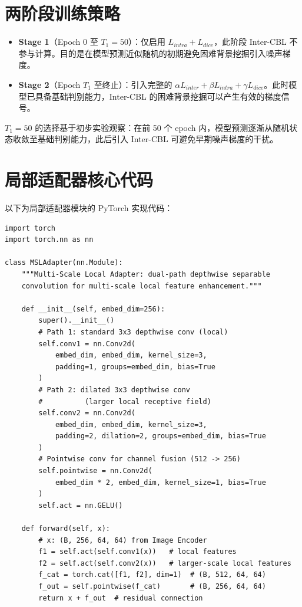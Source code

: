 \section{两阶段训练策略}

\begin{itemize}
  \item \textbf{Stage 1}（Epoch 0 至 $T_1=50$）：仅启用 $L_{intra} + L_{dice}$，此阶段 Inter-CBL 不参与计算。目的是在模型预测近似随机的初期避免困难背景挖掘引入噪声梯度。
  \item \textbf{Stage 2}（Epoch $T_1$ 至终止）：引入完整的 $\alpha L_{inter} + \beta L_{intra} + \gamma L_{dice}$。此时模型已具备基础判别能力，Inter-CBL 的困难背景挖掘可以产生有效的梯度信号。
\end{itemize}

$T_1=50$ 的选择基于初步实验观察：在前 50 个 epoch 内，模型预测逐渐从随机状态收敛至基础判别能力，此后引入 Inter-CBL 可避免早期噪声梯度的干扰。

\section{局部适配器核心代码}

以下为局部适配器模块的 PyTorch 实现代码：

\begin{lstlisting}
import torch
import torch.nn as nn

class MSLAdapter(nn.Module):
    """Multi-Scale Local Adapter: dual-path depthwise separable
    convolution for multi-scale local feature enhancement."""

    def __init__(self, embed_dim=256):
        super().__init__()
        # Path 1: standard 3x3 depthwise conv (local)
        self.conv1 = nn.Conv2d(
            embed_dim, embed_dim, kernel_size=3,
            padding=1, groups=embed_dim, bias=True
        )
        # Path 2: dilated 3x3 depthwise conv
        #          (larger local receptive field)
        self.conv2 = nn.Conv2d(
            embed_dim, embed_dim, kernel_size=3,
            padding=2, dilation=2, groups=embed_dim, bias=True
        )
        # Pointwise conv for channel fusion (512 -> 256)
        self.pointwise = nn.Conv2d(
            embed_dim * 2, embed_dim, kernel_size=1, bias=True
        )
        self.act = nn.GELU()

    def forward(self, x):
        # x: (B, 256, 64, 64) from Image Encoder
        f1 = self.act(self.conv1(x))   # local features
        f2 = self.act(self.conv2(x))   # larger-scale local features
        f_cat = torch.cat([f1, f2], dim=1)  # (B, 512, 64, 64)
        f_out = self.pointwise(f_cat)       # (B, 256, 64, 64)
        return x + f_out  # residual connection
\end{lstlisting}

